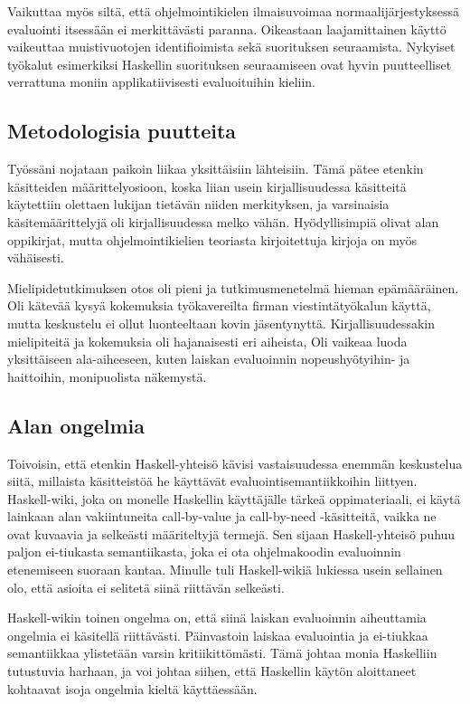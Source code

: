 Vaikuttaa myös siltä, että ohjelmointikielen ilmaisuvoimaa normaalijärjestyksessä evaluointi itsessään ei merkittävästi paranna. Oikeastaan laajamittainen käyttö vaikeuttaa muistivuotojen identifioimista sekä suorituksen seuraamista. Nykyiset työkalut esimerkiksi Haskellin suorituksen seuraamiseen ovat hyvin puutteelliset verrattuna moniin applikatiivisesti evaluoituihin kieliin.

\subsection{Metodologisia puutteita}

Työssäni nojataan paikoin liikaa yksittäisiin lähteisiin. Tämä pätee etenkin käsitteiden määrittelyosioon, koska liian usein kirjallisuudessa käsitteitä käytettiin olettaen lukijan tietävän niiden merkityksen, ja varsinaisia käsitemäärittelyjä oli kirjallisuudessa melko vähän. Hyödyllisimpiä olivat alan oppikirjat, mutta ohjelmointikielien teoriasta kirjoitettuja kirjoja on myös vähäisesti.

Mielipidetutkimuksen otos oli pieni ja tutkimusmenetelmä hieman epämääräinen. Oli kätevää kysyä kokemuksia työkavereilta firman viestintätyökalun käyttä, mutta keskustelu ei ollut luonteeltaan kovin jäsentynyttä. Kirjallisuudessakin mielipiteitä ja kokemuksia oli hajanaisesti eri aiheista, Oli vaikeaa luoda yksittäiseen ala-aiheeseen, kuten laiskan evaluoinnin nopeushyötyihin- ja haittoihin, monipuolista näkemystä.

\subsection{Alan ongelmia}

Toivoisin, että etenkin Haskell-yhteisö kävisi vastaisuudessa enemmän keskustelua siitä, millaista käsitteistöä he käyttävät evaluointisemantiikkoihin liittyen. Haskell-wiki, joka on monelle Haskellin käyttäjälle tärkeä oppimateriaali, ei käytä lainkaan alan vakiintuneita call-by-value ja call-by-need -käsitteitä, vaikka ne ovat kuvaavia ja selkeästi määriteltyjä termejä. Sen sijaan Haskell-yhteisö puhuu paljon ei-tiukasta semantiikasta, joka ei ota ohjelmakoodin evaluoinnin etenemiseen suoraan kantaa. Minulle tuli Haskell-wikiä lukiessa usein sellainen olo, että asioita ei selitetä siinä riittävän selkeästi.

Haskell-wikin toinen ongelma on, että siinä laiskan evaluoinnin aiheuttamia ongelmia ei käsitellä riittävästi. Päinvastoin laiskaa evaluointia ja ei-tiukkaa semantiikkaa ylistetään varsin kritiikittömästi. Tämä johtaa monia Haskelliin tutustuvia harhaan, ja voi johtaa siihen, että Haskellin käytön aloittaneet kohtaavat isoja ongelmia kieltä käyttäessään.

